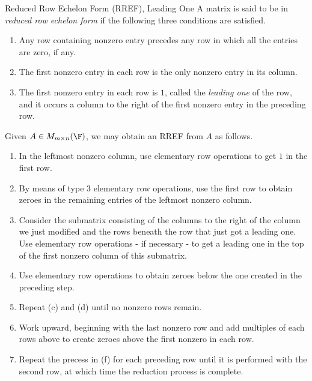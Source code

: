 \documentclass[linearalgebraI]{subfiles}
\begin{document}
    \begin{definition}{Reduced Row Echelon Form (RREF), Leading One}{}
            A matrix is said to be in \emph{reduced row echelon form} if the following three conditions are satisfied.
            \begin{enumerate}
                \item Any row containing nonzero entry precedes any row in which all the entries are zero, if any.
                \item The first nonzero entry in each row is the only nonzero entry in its column.
                \item The first nonzero entry in each row is $1$, called the \emph{leading one} of the row, and it occurs a column to the right of the first nonzero entry in the preceding row.
            \end{enumerate}
    \end{definition}

    \begin{remark}
        Given $A\in M_{m\times n}(\F)$, we may obtain an RREF from $A$ as follows. 
        \begin{enumerate}
            \item In the leftmost nonzero column, use elementary row operations to get $1$ in the first row.
            \item By means of type 3 elementary row operations, use the first row to obtain zeroes in the remaining entries of the leftmost nonzero column.
            \item Consider the submatrix consisting of the columns to the right of the column we just modified and the rows beneath the row that just got a leading one. Use elementary row operations - if necessary - to get a leading one in the top of the first nonzero column of this submatrix.
            \item Use elementary row operations to obtain zeroes below the one created in the preceding step.
            \item Repeat (c) and (d) until no nonzero rows remain.
            \item Work upward, beginning with the last nonzero row and add multiples of each rows above to create zeroes above the first nonzero in each row.
            \item Repeat the precess in (f) for each preceding row until it is performed with the second row, at which time the reduction process is complete.
        \end{enumerate}
    \end{remark}
\end{document}
